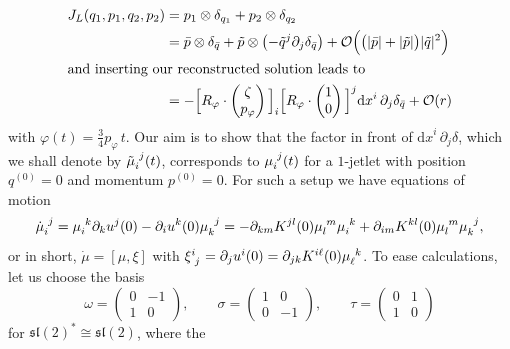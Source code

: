 \documentclass[12pt]{amsart}
\newcommand{\dx}{\ensuremath{\textrm{d}x}}
\begin{document}
\begin{align}
  J_L(q_1,p_1,q_2,p_2)
  &= p_1 \otimes \delta_{q_1} + p_2 \otimes \delta_{q_2} \notag\\
  &= \bar{p} \otimes \delta_{\bar{q}} +\tilde{p} \otimes
     \big({-\tilde{q}^j} \partial_j\delta_{\bar{q}}\big)
    +\mathcal{O}\Big(\big(|\bar{p}|+|\tilde{p}|\big)|\tilde{q}|^2\Big) \notag\\
\intertext{and inserting our reconstructed solution leads to}
  &= -\Big[R_\varphi \cdot \begin{pmatrix} \zeta \\ p_\varphi \end{pmatrix}\Big]_i
      \Big[R_\varphi \cdot \begin{pmatrix} 1   \\ 0         \end{pmatrix}\Big]^j \dx^i\,\partial_j
      \delta_{\bar{q}} +\mathcal{O}(r) \label{eq:asymptotic-dynamics}
\end{align}
with $\varphi(t) = \frac{3}{4} p_\varphi\,t$. Our aim is to show that
the factor in front of $\dx^i\,\partial_j \delta$, which we shall denote
by $\tilde{\mu}\indices{_i^j}(t)$, corresponds to
$\mu\indices{_i^j}(t)$ for a $1$-jetlet with position $q^{(0)} = 0$
and momentum $p^{(0)} = 0$. For such a setup we have equations of
motion
\begin{equation*}
  \dot{\mu}\indices{_i^j}
  = \mu\indices{_i^k} \partial_k u^j(0) - \partial_i u^k(0) \mu\indices{_k^j}
  = -\partial_{km} K^{jl}(0) \mu\indices{_l^m} \mu\indices{_i^k}
    +\partial_{im} K^{kl}(0) \mu\indices{_l^m} \mu\indices{_k^j},
\end{equation*}
or in short, $\dot{\mu} = [\mu,\xi]$ with $\xi\indices{^i_j} = \partial_ju^i(0) = \partial_{jk}K^{i\ell}(0) \mu\indices{_\ell^k}$. To
ease calculations, let us choose the basis
\begin{equation}\label{eq:basis-sl2}
  \omega = \begin{pmatrix}
    0 & -1 \\
    1 & 0
  \end{pmatrix},\qquad
  \sigma = \begin{pmatrix}
    1 & 0 \\
    0 & -1
  \end{pmatrix},\qquad
  \tau = \begin{pmatrix}
    0 & 1 \\
    1 & 0
  \end{pmatrix}
\end{equation}
for $\mathfrak{sl}(2)^* \cong \mathfrak{sl}(2)$, where the
\end{document}
